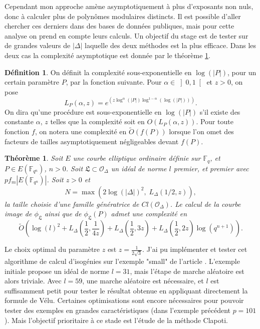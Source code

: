 \documentclass{article}
\newcommand{\OR}[0]{\mathcal{O}}
\newcommand{\LR}[0]{\mathfrak{L}}
\newcommand{\F}[0]{\mathbb{F}}
\newtheorem{The}{Théorème}[section]
\theoremstyle{definition}
\newtheorem*{Def}{Définition}
\theoremstyle{remark}
\begin{document}
	Cependant mon approche amène asymptotiquement à plus d'exposants non nuls, donc à calculer plus de polynômes modulaires distincts. Il est possible d'aller chercher ces derniers dans des bases de données publiques, mais pour cette analyse on prend en compte leurs calculs. Un objectif du stage est de tester sur de grandes valeurs de $|\Delta|$ laquelle des deux méthodes est la plus efficace. Dans les deux cas la complexité asymptotique est donnée par le théorème \ref{theoreme}. 
	
	\begin{Def}
		
		On définit la complexité sous-exponentielle en $\log(|P|)$, pour un certain paramètre $P$, par la fonction suivante. Pour $\alpha\in\left] 0,1 \right[$ et $z>0$, on pose
		\begin{equation*}
			L_P(\alpha,z) = e^{\left( z\log^{\alpha}(|P|)\log^{1-\alpha}(\log(|P|))\right) }.
		\end{equation*}
		On dira qu'une procédure est sous-exponentielle en $\log(|P|)$ s'il existe des constante $\alpha$, $z$ telles que la complexité soit en $O(L_P(\alpha,z))$. Pour toute fonction $f$, on notera une complexité en $\tilde{O}(f(P))$ lorsque l'on omet des facteurs de tailles asymptotiquement négligeables devant $f(P)$.
		
	\end{Def}
	
	\newpage
	
	\begin{The}\label{theoreme}
		Soit $E$ une courbe elliptique ordinaire définie sur $\F_q$, et $P\in E(\F_{q^{n}})$, $n > 0$. Soit  $\LR\subset\OR_{\Delta}$ un idéal de norme $l$ premier, et premier avec $pf_m|E(\F_{q^{n}})|$. Soit $z>0$ et
		\begin{equation*}
			N = \max\left(2\log(|\Delta|)^2,\; L_\Delta(1/2, z)\right), 
		\end{equation*}
		la taille choisie d'une famille génératrice de $Cl(\OR_\Delta)$. Le calcul de la courbe image de $\phi_\LR$ ainsi que de $\phi_\LR(P)$ admet une complexité en
		\begin{equation*}
			\tilde{O}\left( \log(l)^2 + L_\Delta\left(\frac{1}{2}, \frac{1}{4z}\right) + L_\Delta\left(\frac{1}{2}, 3z\right) + L_\Delta\left( \frac{1}{2}, 2z\right) \log(q^{n+1}) \right).
		\end{equation*}
		
	\end{The}
	
	Le choix optimal du paramètre $z$ est $z = \frac{1}{2\sqrt{3}}$. J'ai pu implémenter et tester cet algorithme de calcul d'isogénies sur l'exemple "small" de l'article \cite{BrokerCharlesLauter}. L'exemple initiale propose un idéal de norme $l = 31$, mais l'étape de marche aléatoire est alors triviale. Avec $l=59$, une marche aléatoire est nécessaire, et $l$ est suffisamment petit pour tester le résultat obtenue en appliquant directement la formule de Vélu. Certaines optimisations sont encore nécessaires pour pouvoir tester des exemples en grandes caractéristiques (dans l'exemple précédent $p = 101$). Mais l'objectif prioritaire à ce stade est l'étude de la méthode Clapoti. 
	
\end{document}
